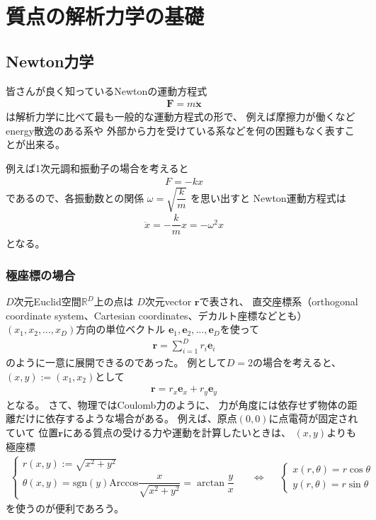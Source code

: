 \section{質点の解析力学の基礎}

\subsection{Newton力学}

皆さんが良く知っているNewtonの運動方程式
\begin{align}
  \bm{F} = m\ddot{\bm{x}}
\label{newton eom}
\end{align}
は解析力学に比べて最も一般的な運動方程式の形で、
例えば摩擦力が働くなどenergy散逸のある系や
外部から力を受けている系などを何の困難もなく表すことが出来る。

例えば1次元調和振動子の場合を考えると
\begin{align}
  F = -k x
\end{align}
であるので、各振動数との関係
$\omega = \sqrt{\dfrac{k}{m}}$
を思い出すと
Newton運動方程式は
\begin{align}
  \ddot{x}
  = - \dfrac{k}{m} x
  = - \omega^2 x
\label{newton harm osci eom}
\end{align}
となる。

\subsubsection{極座標の場合}

$D$次元Euclid空間$\mathbb{R}^D$上の点は
$D$次元vector $\bm{r}$で表され、
直交座標系（orthogonal coordinate system、Cartesian coordinates、デカルト座標などとも）
$(x_1, x_2, \dots, x_D)$方向の単位ベクトル
$\bm{e}_1, \bm{e}_2, \dots, \bm{e}_D$を使って
\begin{align}
  \bm{r} = \sum_{i = 1}^D r_i \bm{e}_i
\end{align}
のように一意に展開できるのであった。
例として$D = 2$の場合を考えると、
$(x,y) := (x_1, x_2)$として
\begin{align}
  \bm{r} = r_x \bm{e}_x + r_y \bm{e}_y
\end{align}
となる。
さて、物理ではCoulomb力のように、
力が角度には依存せず物体の距離だけに依存するような場合がある。
例えば、原点$(0, 0)$に点電荷が固定されていて
位置$\bm{r}$にある質点の受ける力や運動を計算したいときは、
$(x, y)$よりも極座標
\begin{align}
  \begin{cases}
    r(x, y) := \sqrt{x^2 + y^2}
  \\
    \theta(x, y)
    =
    \mathrm{sgn} (y) \mathrm{Arccos}
    \dfrac{x}{ \sqrt{x^2 + y^2} }
    =
    \arctan \dfrac{y}{x}
  \end{cases}
&&\Leftrightarrow&&
  \begin{cases}
    x(r, \theta) = r \cos\theta
  \\
    y(r, \theta) = r \sin\theta
  \end{cases}
\end{align}
を使うのが便利であろう。

